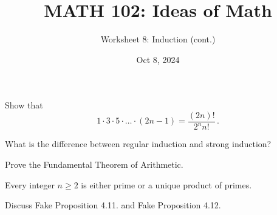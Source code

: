\documentclass[12pt]{amsart}
\title{ MATH 102: Ideas  of Math }
\author{ Worksheet 8: Induction (cont.) }
\date{Oct 8, 2024}
\begin{document}
\maketitle

\begin{question}
	Show that
	\begin{equation*}
		1 \cdot 3 \cdot 5 \cdot \dots \cdot (2n -1) = \frac{(2n)!}{2^n n!} \,.
	\end{equation*}
\end{question}

\newpage

\begin{question}
	What is the difference between regular induction and strong induction?
\end{question}

\newpage

\begin{question}
	Prove the Fundamental Theorem of Arithmetic.

	Every integer $n\geq 2$ is either prime or a unique product of primes.
\end{question}

\newpage

\begin{question}
	Discuss Fake Proposition 4.11. and Fake Proposition 4.12.
\end{question}
\end{document}
